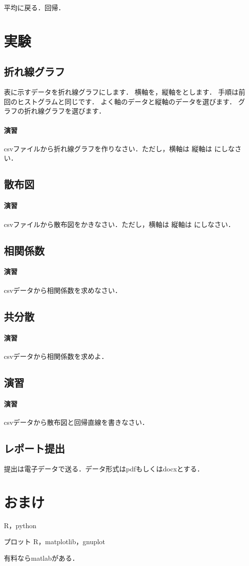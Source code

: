 \documentclass[12pt, a4j]{jreport}
\begin{document}
平均に戻る．回帰．


\section{実験}

\subsection{折れ線グラフ}

表に示すデータを折れ線グラフにします．
横軸を，縦軸をとします．
手順は前回のヒストグラムと同じです．
よく軸のデータと縦軸のデータを選びます．
グラフの折れ線グラフを選びます．

\paragraph{演習}
csvファイルから折れ線グラフを作りなさい．ただし，横軸は 縦軸は にしなさい．

\subsection{散布図}

\paragraph{演習}

csvファイルから散布図をかきなさい．ただし，横軸は 縦軸は にしなさい．


\subsection{相関係数}

\paragraph{演習}
csvデータから相関係数を求めなさい．

\subsection{共分散}

\paragraph{演習}
csvデータから相関係数を求めよ．

\subsection{演習}

\paragraph{演習}

csvデータから散布図と回帰直線を書きなさい．

\subsection{レポート提出}

提出は電子データで送る．データ形式はpdfもしくはdocxとする．


\section{おまけ}
R，python

プロット
R，matplotlib，gnuplot


有料ならmatlabがある．
\end{document}
